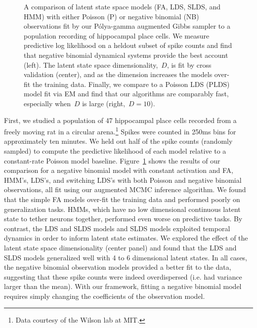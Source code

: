 \begin{figure}
\begin{subfigure}[t]{\textwidth}
  \end{subfigure}
  \vspace{-1em}
  \caption[Comparison of state space models on hippocampal data]
  {A comparison of latent state space models (FA, LDS, SLDS,
    and HMM) with either Poisson (P) or negative binomial (NB)
    observations fit by our P\'{o}lya-gamma augmented Gibbs sampler to
    a population recording of hippocampal place cells. We measure
    predictive log likelihood on a heldout subset of spike counts and
    find that negative binomial dynamical systems provide the best
    account (left). The latent state space dimensionality,~$D$, is fit
    by cross validation (center), and as the dimension increases the
    models over-fit the training data. Finally, we compare to a
    Poisson LDS (PLDS) model fit via EM and find that our algorithms
    are comparably fast, especially when~$D$ is large
    (right,~$D=10$).}
  \label{fig:hipp}
\end{figure}


First, we studied a population of 47 hippocampal place cells recorded from a freely moving rat in a 
circular arena.\footnote{Data courtesy of the Wilson lab at MIT.} Spikes were counted in 
250ms bins for approximately ten minutes.
 We held out half of the spike counts (randomly sampled) to compute the predictive 
likelihood of each model relative to a constant-rate Poisson model baseline. 
Figure~\ref{fig:hipp} shows the results of our comparison for a negative binomial model with constant 
activation and FA, HMM's, LDS's, and switching LDS's with both Poisson and negative binomial observations,
all fit using our augmented MCMC inference algorithm.  We found that the simple FA models over-fit the 
training data and performed poorly on generalization tasks. HMMs, which 
have no low dimensional continuous latent state to tether neurons together, 
performed even worse on predictive tasks. By contrast, the LDS and SLDS 
models and SLDS models exploited temporal dynamics in order to inform latent state estimates.
We explored the effect of the latent state space dimensionality (center panel) and found that 
the LDS and SLDS models generalized well with 4 to 6 dimensional latent states. 
In all cases, the negative binomial 
observation models provided a better fit to the data, suggesting that these 
spike counts were indeed overdispersed (i.e. had variance larger than the mean). With 
our framework, fitting a negative binomial model requires simply changing the 
coefficients of the observation model.

